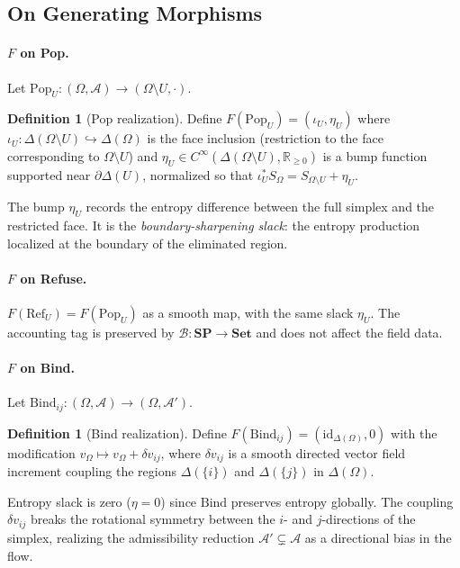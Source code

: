 \documentclass[12pt,a4paper]{article}
\theoremstyle{definition}
\newtheorem{definition}[theorem]{Definition}
\theoremstyle{remark}
\newcommand{\Rnn}{\mathbb{R}_{\ge 0}}
\newcommand{\SP}{\mathbf{SP}}
\newcommand{\id}{\mathrm{id}}
\newcommand{\Pop}{\mathrm{Pop}}
\newcommand{\Ref}{\mathrm{Ref}}
\newcommand{\Bind}{\mathrm{Bind}}
\newcommand{\vF}{v}
\newcommand{\SF}{S}
\begin{document}
\subsection{On Generating Morphisms}

\paragraph{$F$ on Pop.}
Let $\Pop_U:(\Omega,\mathcal{A})\to(\Omega\setminus U,\cdot)$.

\begin{definition}[Pop realization]
\label{def:F-pop}
Define $F(\Pop_U)=(\iota_U,\eta_U)$ where $\iota_U:\Delta(\Omega\setminus U)
\hookrightarrow\Delta(\Omega)$ is the face inclusion (restriction to the face
corresponding to $\Omega\setminus U$) and $\eta_U\in C^\infty(\Delta(\Omega\setminus
U),\Rnn)$ is a bump function supported near $\partial\Delta(U)$, normalized so that
$\iota_U^*\SF_\Omega=\SF_{\Omega\setminus U}+\eta_U$.
\end{definition}

The bump $\eta_U$ records the entropy difference between the full simplex and the
restricted face. It is the \emph{boundary-sharpening slack}: the entropy production
localized at the boundary of the eliminated region.

\paragraph{$F$ on Refuse.}
$F(\Ref_U)=F(\Pop_U)$ as a smooth map, with the same slack $\eta_U$. The accounting
tag is preserved by $\mathcal{B}:\SP\to\mathbf{Set}$ and does not affect the field data.

\paragraph{$F$ on Bind.}
Let $\Bind_{ij}:(\Omega,\mathcal{A})\to(\Omega,\mathcal{A}')$.

\begin{definition}[Bind realization]
\label{def:F-bind}
Define $F(\Bind_{ij})=(\id_{\Delta(\Omega)},0)$ with the modification
$\vF_\Omega\mapsto\vF_\Omega+\delta\vF_{ij}$, where $\delta\vF_{ij}$ is a smooth
directed vector field increment coupling the regions $\Delta(\{i\})$ and
$\Delta(\{j\})$ in $\Delta(\Omega)$.
\end{definition}

Entropy slack is zero ($\eta=0$) since $\Bind$ preserves entropy globally. The
coupling $\delta\vF_{ij}$ breaks the rotational symmetry between the $i$- and
$j$-directions of the simplex, realizing the admissibility reduction
$\mathcal{A}'\subsetneq\mathcal{A}$ as a directional bias in the flow.
\end{document}

